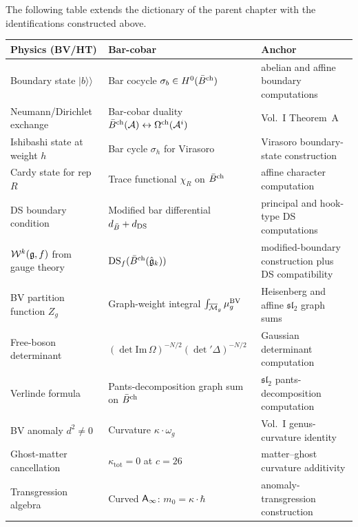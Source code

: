 \begin{remark}
The following table extends the dictionary of the parent chapter with
the identifications constructed above.

\begin{center}
\renewcommand{\arraystretch}{1.15}
\begin{tabular}{|p{}|p{}|p{}|}
\hline
\textbf{Physics (BV/HT)} &
\textbf{Bar-cobar} &
\textbf{Anchor} \\
\hline
Boundary state $|b\rangle\!\rangle$ &
Bar cocycle $\sigma_b \in H^0(\bar{B}^{\mathrm{ch}})$ &
abelian and affine boundary computations \\
\hline
Neumann/Dirichlet exchange &
Bar-cobar duality $\bar{B}^{\mathrm{ch}}(\mathcal{A}) \leftrightarrow \Omega^{\mathrm{ch}}(\mathcal{A}^i)$ &
Vol.~I Theorem~A \\
\hline
Ishibashi state at weight $h$ &
Bar cycle $\sigma_h$ for Virasoro &
Virasoro boundary-state construction \\
\hline
Cardy state for rep $R$ &
Trace functional $\chi_R$ on $\bar{B}^{\mathrm{ch}}$ &
affine character computation \\
\hline
DS boundary condition &
Modified bar differential $d_{\bar{B}} + d_{\mathrm{DS}}$ &
principal and hook-type DS computations \\
\hline
$\mathcal{W}^k(\mathfrak{g},f)$ from gauge theory &
$\mathrm{DS}_f(\bar{B}^{\mathrm{ch}}(\hat{\mathfrak{g}}_k))$ &
modified-boundary construction plus DS compatibility \\
\hline
BV partition function $Z_g$ &
Graph-weight integral $\int_{\overline{\mathcal{M}}_g} \mu^{\mathrm{BV}}_g$ &
Heisenberg and affine $\mathfrak{sl}_2$ graph sums \\
\hline
Free-boson determinant &
$(\det \mathrm{Im}\,\Omega)^{-N/2} (\det{}'\Delta)^{-N/2}$ &
Gaussian determinant computation \\
\hline
Verlinde formula &
Pants-decomposition graph sum on $\bar{B}^{\mathrm{ch}}$ &
$\mathfrak{sl}_2$ pants-decomposition computation \\
\hline
BV anomaly $d^2 \neq 0$ &
Curvature $\kappa \cdot \omega_g$ &
Vol.~I genus-curvature identity \\
\hline
Ghost-matter cancellation &
$\kappa_{\mathrm{tot}} = 0$ at $c = 26$ &
matter--ghost curvature additivity \\
\hline
Transgression algebra &
Curved $\mathsf{A}_{\infty}$: $m_0 = \kappa \cdot \hbar$ &
anomaly-transgression construction \\
\hline
\end{tabular}
\end{center}
\end{remark}

